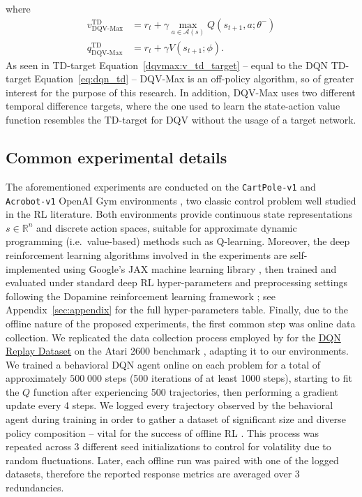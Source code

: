 where
\begin{align}
  v^{\scriptscriptstyle \textrm{TD}}_{\scriptscriptstyle
  \textrm{DQV-Max}}&=r_t+\gamma\max_{a\in\mathcal{A}\left(s\right)}Q\left(s_{t+1},a;\theta^{-}\right)
  \label{dqvmax:v_td_target}\\
  q^{\scriptscriptstyle \textrm{TD}}_{\scriptscriptstyle \textrm{DQV-Max}}&=r_t+\gamma
  V\left(s_{t+1};\phi\right)\label{dqvmax:q_td_target}.
\end{align} As seen in TD-target
Equation~\ref{dqvmax:v_td_target} -- equal to the DQN TD-target
Equation~\ref{eq:dqn_td} -- DQV-Max is an off-policy algorithm, so
of greater interest for the purpose of this research. In addition,
DQV-Max uses two different temporal difference targets, where the one
used to learn the state-action value function resembles the TD-target
for DQV without the usage of a target network.

\subsection{Common experimental details}
The aforementioned experiments are conducted on the
\texttt{CartPole-v1} and \texttt{Acrobot-v1} OpenAI Gym environments
\citep{https://doi.org/10.48550/arxiv.1606.01540}, two classic control
problem well studied in the RL literature. Both environments
provide continuous state representations $s\in \mathbb{R}^n$ and
discrete action spaces, suitable for approximate dynamic programming
(i.e.\ value-based) methods such as Q-learning. Moreover, the
deep reinforcement learning algorithms involved in the experiments are
self-implemented using Google's JAX machine learning library
\citep{jax2018github}, then trained and evaluated under standard deep
RL hyper-parameters and preprocessing settings following the Dopamine
reinforcement
learning framework \citep{castro18dopamine}; see
Appendix~\ref{sec:appendix} for the full hyper-parameters
table. Finally, due to the offline nature of the proposed experiments,
the first common step was online data collection. We replicated the
data collection process employed by \citet{agarwal2020optimistic} for
the \href{https://research.google/tools/datasets/dqn-replay/}{DQN
  Replay Dataset} on the Atari 2600 benchmark
\citep{bellemare2013arcade}, adapting it to our environments. We
trained a behavioral DQN agent online on each problem for a total of
approximately $500 \; 000$ steps (500 iterations of at least 1000
steps),
starting to fit the $Q$ function after experiencing 500
trajectories, then performing a gradient update every 4 steps. We
logged every trajectory observed by the behavioral agent during
training in order to gather a dataset of significant size and diverse
policy composition -- vital for the success of offline RL
\citep{agarwal2020optimistic}. This process was repeated across 3
different seed initializations to control for volatility due to random
fluctuations. Later, each offline run was paired with one of the
logged datasets, therefore the reported response metrics are averaged
over 3 redundancies.

